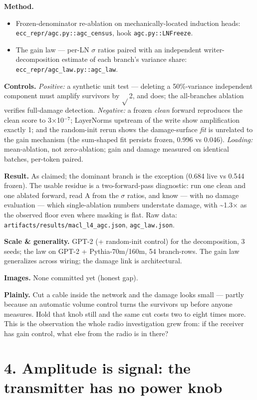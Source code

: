 \documentclass[10pt]{article}
\begin{document}
\textbf{Method.}
\begin{itemize}\setlength\itemsep{1pt}
\item Frozen-denominator re-ablation on mechanically-located induction heads: \texttt{ecc\_repr/agc.py::agc\_census}, hook \texttt{agc.py::LNFreeze}.
\item The gain law --- per-LN $\sigma$ ratios paired with an independent writer-decomposition estimate of each branch's variance share: \texttt{ecc\_repr/agc\_law.py::agc\_law}.
\end{itemize}
\textbf{Controls.} \emph{Positive:} a synthetic unit test --- deleting a 50\%-variance independent component
must amplify survivors by $\sqrt{}$2, and does; the all-branches ablation verifies full-damage detection.
\emph{Negative:} a frozen \emph{clean} forward reproduces the clean score to 3$\times$10$^{-7}$; LayerNorms upstream of
the write show amplification exactly 1; and the random-init rerun shows the damage-surface \emph{fit}
is unrelated to the gain mechanism (the sum-shaped fit persists frozen, 0.996 vs 0.046). \emph{Loading:}
mean-ablation, not zero-ablation; gain and damage measured on identical batches, per-token paired.

\textbf{Result.} As claimed; the dominant branch is the exception (0.684 live vs 0.544 frozen). The
usable residue is a two-forward-pass diagnostic: run one clean and one ablated forward, read A
from the $\sigma$ ratios, and know --- with no damage evaluation --- which single-ablation numbers understate
damage, with \textasciitilde{}1.3$\times$ as the observed floor even where masking is flat. Raw data:
\texttt{artifacts/results/macl\_l4\_agc.json}, \texttt{agc\_law.json}.

\textbf{Scale \& generality.} GPT-2 (+ random-init control) for the decomposition, 3 seeds; the law on
GPT-2 + Pythia-70m/160m, 54 branch-rows. The gain law generalizes across wiring; the damage link
is architectural.

\textbf{Images.} None committed yet (honest gap).

\textbf{Plainly.} Cut a cable inside the network and the damage looks small --- partly because an
automatic volume control turns the survivors up before anyone measures. Hold that knob still and
the same cut costs two to eight times more. This is the observation the whole radio investigation
grew from: if the receiver has gain control, what else from the radio is in there?

\section{4. Amplitude is signal: the transmitter has no power knob}
\end{document}
